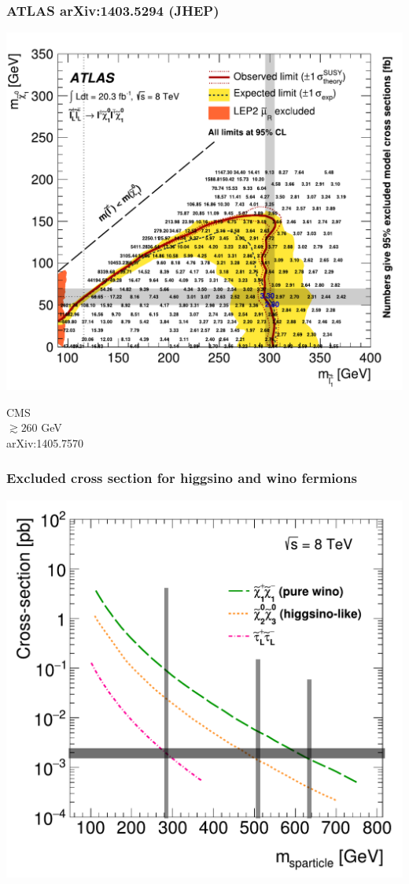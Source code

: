 \documentclass[%
xcolor=dvipsnames,table%
]{beamer}
\begin{document}
%
%
\begin{frame}
  \frametitle{ATLAS arXiv:1403.5294 (JHEP)}
  \includegraphics[scale=0.46]{figaux_20b} 
\parbox[b]{3cm}{
CMS\\
$\gtrsim 260$ GeV\\
arXiv:1405.7570 
}

\end{frame}
%
%
\begin{frame}
  \frametitle{Excluded cross section for higgsino and wino fermions}
\includegraphics[scale=0.45]{fig_01}
\end{frame}
\end{document}

